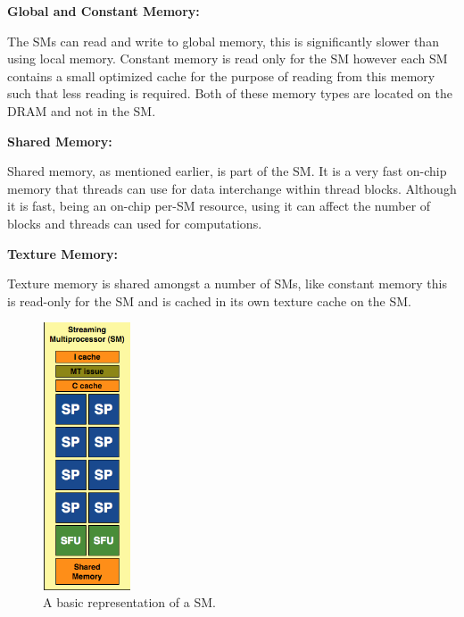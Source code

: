 \textbf{Global and Constant Memory:}

The SMs can read and write to global memory, this is significantly slower than using local memory. %
Constant memory is read only for the SM however each SM contains a small optimized cache for the purpose of reading from this memory such that less reading is required. 
Both of these memory types are located on the DRAM and not in the SM.

\textbf{Shared Memory:}

Shared memory, as mentioned earlier, is part of the SM.
It is a very fast on-chip memory that threads can use for data interchange within thread blocks.
Although it is fast, being an on-chip per-SM resource, using it can affect the number of blocks and threads can used for computations.

\textbf{Texture Memory:}

Texture memory is shared amongst a number of SMs, like constant memory this is read-only for the SM and is cached in its own texture cache on the SM.

\begin{figure}
 \vspace{-50pt}
 \begin{center}
  \includegraphics[width=0.23\textwidth]{figures/SM.png}
 \end{center}
 \caption{A basic representation of a SM.}\label{image:SM} 
 \vspace{-35pt}
\end{figure}
